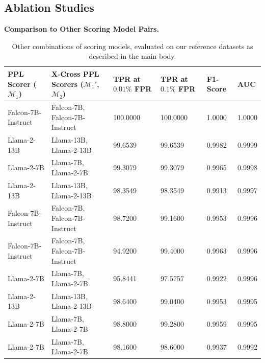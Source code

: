 \documentclass{article} %
\newcommand{\update}[1]{{{#1}}}
\begin{document}
\subsection{Ablation Studies}
\label{sec:ablations}

\textbf{Comparison to Other Scoring Model Pairs.} 

\begin{table}[htbp]
    \centering
    \footnotesize
    \caption{Other combinations of scoring models, evaluated on our reference datasets as described in the main body.}
    \hspace*{-1cm}
    \begin{tabular}{llp{1.5cm}p{1.5cm}p{1.5cm}p{1.5cm}}
        \toprule
          PPL Scorer ($\mathcal{M}_1$) 
        & X-Cross PPL Scorers ($\mathcal{M}_1'$, $\mathcal{M}_2$)
        & TPR at $0.01\%$ FPR
        & \update{TPR at $0.1\%$ FPR}
        & \update{F1-Score}
        & \update{AUC}
        \\
        \midrule
        Falcon-7B-Instruct     & Falcon-7B, Falcon-7B-Instruct     & 100.0000      & 100.0000    & 1.0000         & 1.0000   \\
        Llama-2-13B            & Llama-13B, Llama-2-13B            & 99.6539       & 99.6539     & 0.9982         & 0.9999   \\
        Llama-2-7B             & Llama-7B, Llama-2-7B              & 99.3079       & 99.3079     & 0.9965         & 0.9998   \\
        Llama-2-13B            & Llama-13B, Llama-2-13B            & 98.3549       & 98.3549     & 0.9913         & 0.9997   \\
        Falcon-7B-Instruct     & Falcon-7B, Falcon-7B-Instruct     & 98.7200       & 99.1600     & 0.9953         & 0.9996   \\
        Falcon-7B-Instruct     & Falcon-7B, Falcon-7B-Instruct     & 94.9200       & 99.4000     & 0.9963         & 0.9996   \\
        Llama-2-7B             & Llama-7B, Llama-2-7B              & 95.8441       & 97.5757     & 0.9922         & 0.9996   \\
        Llama-2-13B            & Llama-13B, Llama-2-13B            & 98.6400       & 99.0400     & 0.9953         & 0.9995   \\
        Llama-2-7B             & Llama-7B, Llama-2-7B              & 98.8000       & 99.2800     & 0.9959         & 0.9995   \\
        Llama-2-7B             & Llama-7B, Llama-2-7B              & 98.1600       & 98.6000     & 0.9937         & 0.9992   \\

\end{tabular}
\end{table}
\end{document}
